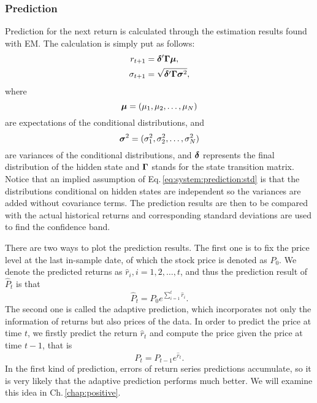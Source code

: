 \subsubsection{Prediction}
\label{sec:system:function:prediction:prediction}
Prediction for the next return is calculated through the estimation results found with EM.
The calculation is simply put as follows:
		\begin{subequations}
		\begin{align}
		\label{eq:system:prediction:ret}
		r_{t+1} & = {\boldsymbol\delta}^{\prime} {\boldsymbol\Gamma} {\boldsymbol\mu}, \\
		\label{eq:system:prediction:std}
		\sigma_{t+1} & = \sqrt{{\boldsymbol\delta}^{\prime} {\boldsymbol\Gamma} {\boldsymbol\sigma}^2},
		\end{align}
		\end{subequations}
where
		\begin{equation}
		\label{eq:system:mu}
		{\boldsymbol\mu} = (\mu_1, \mu_2, \dots, \mu_N)
		\end{equation}
are expectations of the conditional distributions, and
		\begin{equation}
		\label{eq:system:sigma}
		{\boldsymbol\sigma}^2 = (\sigma^2_1, \sigma^2_2, \dots, \sigma^2_N)
		\end{equation}
are variances of the conditional distributions,
and ${\boldsymbol\delta}$ represents the final distribution of the hidden state 
and ${\boldsymbol\Gamma}$ stands for the state transition matrix.
Notice that an implied assumption of Eq.\,\ref{eq:system:prediction:std} is that
the distributions conditional on hidden states are independent
so the variances are added without covariance terms.
The prediction results are then to be compared with the actual historical returns 
and corresponding standard deviations are used to find the confidence band.

There are two ways to plot the prediction results.
The first one is to fix the price level at the last in-sample date,
of which the stock price is denoted as $P_0$.
We denote the predicted returns as $\hat{r}_i, i = 1,2,\dots,t$,
and thus the prediction result of $\hat{P}_t$ is that
		\begin{equation}
		\hat{P}_t = P_0 e^{\sum_{i=1}^{t}\hat{r}_i}.
		\end{equation}
The second one is called the adaptive prediction, 
which incorporates not only the information of returns but also prices of the data.
In order to predict the price at time $t$, 
we firstly predict the return $\hat{r}_t$ and compute the price given the price at time $t-1$,
that is
		\begin{equation}
		\hat{P}_t = P_{t-1} e^{\hat{r}_t}.
		\end{equation}
In the first kind of prediction, errors of return series predictions accumulate,
so it is very likely that the adaptive prediction performs much better.
We will examine this idea in Ch.\,\ref{chap:positive}.


